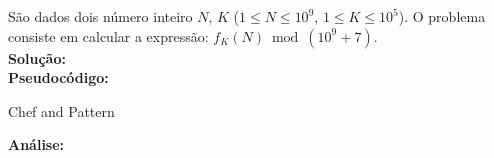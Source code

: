São dados dois número inteiro $N$, $K$ ($1 \leq N \leq 10^9$, $1 \leq K \leq 10^5$). O problema consiste em calcular a expressão: $f_K(N) \bmod (10^9+7)$.
\\

\textbf{Solução:}
\\

\textbf{Pseudocódigo:}
\begin{algorithm}
\caption{Chef and Pattern}
\begin{algorithmic}[1]

\EndProcedure
\end{algorithmic}
\end{algorithm}


\textbf{Análise:}


